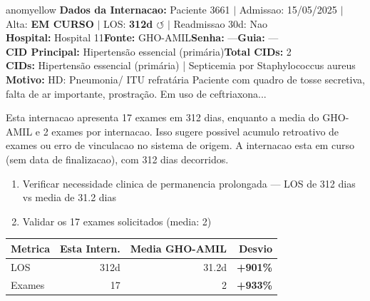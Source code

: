 \documentclass[a4paper,10pt]{article}
\begin{document}
\begin{anomalycard}[Internacao 3735 | GHO-AMIL | MODERADO (z=2.32)]{anomyellow}
\textbf{Dados da Internacao:} Paciente 3661 $\mid$ Admissao: 15/05/2025 $\mid$ Alta: \textcolor{anomorange}{\textbf{EM CURSO}} $\mid$ LOS: \textbf{312d \textcolor{anomorange}{$\circlearrowleft$}} $\mid$ Readmissao 30d: Nao\\
\textbf{Hospital:} Hospital 11\quad\textbf{Fonte:} GHO-AMIL\quad\textbf{Senha:} ---\quad\textbf{Guia:} ---\\
\textbf{CID Principal:} {\small Hipertensão essencial (primária)}\quad\textbf{Total CIDs:} 2\\

\textbf{CIDs:} {\scriptsize Hipertensão essencial (primária) | Septicemia por Staphylococcus aureus}\\

\textbf{Motivo:} {\scriptsize HD: Pneumonia/ ITU refratária  Paciente com quadro de tosse secretiva, falta de ar importante, prostração. Em uso de ceftriaxona...}\\

\vspace{2pt}\begin{tcolorbox}[colback=severityred!20,colframe=anomyellow,title={\textbf{Interpretacao de Negocio}},fonttitle=\bfseries\small,left=4pt,right=4pt,top=3pt,bottom=3pt]
{\small Esta internacao apresenta 17 exames em 312 dias, enquanto a media do GHO-AMIL e 2 exames por internacao. Isso sugere possivel acumulo retroativo de exames ou erro de vinculacao no sistema de origem. A internacao esta em curso (sem data de finalizacao), com 312 dias decorridos.}
\end{tcolorbox}
\begin{tcolorbox}[colback=severityyellow!30,colframe=anomorange,title={\textbf{Recomendacoes Especificas}},fonttitle=\bfseries\small,left=4pt,right=4pt,top=3pt,bottom=3pt]
\begin{enumerate}[nosep,leftmargin=16pt]
\item {\small Verificar necessidade clinica de permanencia prolongada --- LOS de 312 dias vs media de 31.2 dias}
\item {\small Validar os 17 exames solicitados (media: 2)}
\end{enumerate}
\end{tcolorbox}
\begin{center}\begin{tabular}{l r r r}\toprule\textbf{Metrica} & \textbf{Esta Intern.} & \textbf{Media GHO-AMIL} & \textbf{Desvio} \\\midrule
LOS & 312d & 31.2d & \textcolor{anomred}{\textbf{+901\%}} \\
Exames & 17 & 2 & \textcolor{anomred}{\textbf{+933\%}} \\
\bottomrule\end{tabular}\end{center}


\end{anomalycard}
\end{document}
